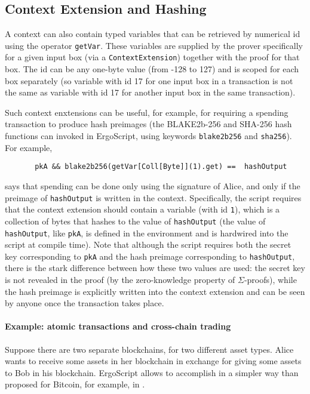 \documentclass[11pt]{article}
\newcommand{\langname}{ErgoScript\xspace}
\begin{document}
\subsection{Context Extension and Hashing}
\label{sec:extension}
A context can also contain typed variables that can be retrieved by numerical id using the operator \texttt{getVar}. These variables are supplied by the prover specifically for a given input box (via a \texttt{ContextExtension}) together with the proof for that box. The id can be any one-byte value (from -128 to 127) and is scoped for each box separately (so variable with id 17 for one input box in a transaction is not the same as variable with id 17 for another input box in the same transaction).

Such context enxtensions can be useful, for example, for requiring a spending transaction to produce hash preimages (the BLAKE2b-256 and SHA-256 hash functions can invoked in \langname, using keywords \texttt{blake2b256} and \texttt{sha256}). For example,
\begin{verbatim}
       pkA && blake2b256(getVar[Coll[Byte]](1).get) ==  hashOutput
\end{verbatim}
says that spending can be done only using the signature of Alice, and only if the preimage of \texttt{hashOutput} is written in the context. Specifically, the script requires that the context extension should contain a variable (with id \texttt{1}), which is a collection of bytes that hashes to the value of \texttt{hashOutput} (the value of \texttt{hashOutput}, like \texttt{pkA}, is defined in the environment and is hardwired into the script at compile time).  Note that although the script requires both the secret key corresponding to \texttt{pkA} and the hash preimage corresponding to \texttt{hashOutput}, there is the stark difference between how these two values are used: the secret key is not revealed in the proof (by the zero-knowledge property of $\Sigma$-proofs), while the hash preimage is explicitly written into the context extension and can be seen by anyone once the transaction takes place.

\paragraph{Example: atomic transactions and cross-chain trading}
Suppose there are two separate blockchains, for two different asset types. Alice wants to receive some assets in her blockchain in exchange for giving some assets to Bob in his blockchain. \langname allows to accomplish in a simpler way than proposed for Bitcoin, for example, in \cite{Nol13}.
\end{document}

